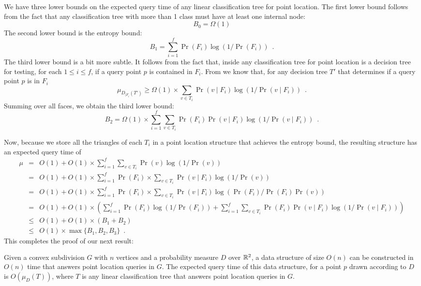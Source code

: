 \documentclass[charterfonts,lotsofwhite]{patmorin}
\begin{document}
We have three lower bounds on the expected query time of any linear
classification tree for point location.  The first lower bound follows
from the fact that any classification tree with more than 1 class must
have at least one internal node:
\[
    B_0 = \Omega(1)
\]
The second lower bound is the
entropy bound:
\[
	B_1 = \sum_{i=1}^f \Pr(F_i)\log(1/\Pr(F_i)) \enspace .
\]
The third lower bound is a bit more subtle.  It follows from the fact
that, inside any classification tree for point location is a decision
tree for testing, for each $1\le i\le f$, if a query point $p$ is
contained in $F_i$.  From  we know that, for any
decision tree $T'$ that determines if a query point $p$ is in $F_i$
\[
   \mu_{D_{|F_i}(T')} \ge \Omega(1)\times \sum_{v\in T_i}\Pr(v\mid
F_i)\log(1/\Pr(v\mid F_i))
	\enspace .
\]
Summing over all faces, we obtain the third lower bound:
\[
   B_2 = \Omega(1)\times \sum_{i=1}^f \sum_{v\in T_i}\Pr(F_i)\Pr(v\mid
F_i)\log(1/\Pr(v\mid F_i))
	\enspace .
\]

Now, because we store all the triangles of each $T_i$ in a point
location structure that achieves the entropy bound, the resulting
structure has an expected query time of 
\begin{eqnarray*}
\mu & = & O(1)+O(1)\times \sum_{i=1}^f \sum_{v\in T_i} \Pr(v)\log(1/\Pr(v)) \\
& = & O(1)+O(1)\times\sum_{i=1}^f \Pr(F_i)\times \sum_{v\in T_i}
\Pr(v\mid F_{i})\log(1/\Pr(v)) \\
& = & O(1)+O(1)\times\sum_{i=1}^f \Pr(F_i)\times \sum_{v\in T_i}
	\Pr(v\mid F_{i})\log(\Pr(F_i)/\Pr(F_i)\Pr(v)) \\
& = & O(1)+O(1)\times\left(\sum_{i=1}^f \Pr(F_i)\log (1/\Pr(F_i)) + 
        \sum_{i=1}^f \sum_{v\in T_i}
	\Pr(F_i)\Pr(v\mid F_{i})\log(1/\Pr(v\mid F_i))\right) \\
& \le & O(1)+O(1)\times(B_1 + B_2) \\
& \le & O(1)\times \max\{B_1, B_2,B_3\} \enspace .
\end{eqnarray*}
This completes the proof of our next result:

\begin{thm}
Given a convex subdivision $G$ with $n$ vertices and a probability measure
$D$ over $\mathbb{R}^2$, a data structure of size
$O(n)$ can be constructed in $O(n)$ time that answers point location queries in 
$G$. 
The expected query time of this data structure, for a point $p$
drawn according to $D$ is $O(\mu_D(T))$, where $T$ is any linear
classification tree that answers point location queries in $G$.
\end{thm}
\end{document}
